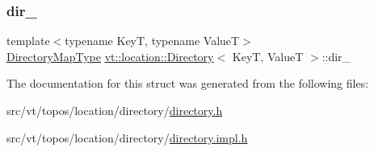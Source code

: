\subsubsection{\texorpdfstring{dir\+\_\+}{dir\_}}
{\footnotesize\ttfamily template$<$typename KeyT, typename ValueT$>$ \\
\hyperlink{structvt_1_1location_1_1_directory_a6a897ff3929eccb2d334eb0b87b53f57}{Directory\+Map\+Type} \hyperlink{structvt_1_1location_1_1_directory}{vt\+::location\+::\+Directory}$<$ KeyT, ValueT $>$\+::dir\+\_\+\hspace{0.3cm}{\ttfamily [private]}}



The documentation for this struct was generated from the following files\+:\begin{DoxyCompactItemize}
\item 
src/vt/topos/location/directory/\hyperlink{directory_8h}{directory.\+h}\item 
src/vt/topos/location/directory/\hyperlink{directory_8impl_8h}{directory.\+impl.\+h}\end{DoxyCompactItemize}
